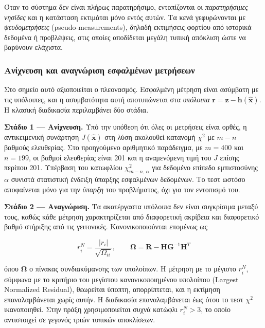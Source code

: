 Όταν το σύστημα δεν είναι πλήρως παρατηρήσιμο, εντοπίζονται οι \emph{παρατηρήσιμες νησίδες}
και η κατάσταση εκτιμάται μόνο εντός αυτών. Τα κενά γεφυρώνονται με \emph{ψευδομετρήσεις}
(pseudo-measurements), δηλαδή εκτιμήσεις φορτίου από ιστορικά δεδομένα ή προβλέψεις, στις
οποίες αποδίδεται μεγάλη τυπική απόκλιση ώστε να βαρύνουν ελάχιστα.

\subsubsection*{Ανίχνευση και αναγνώριση εσφαλμένων μετρήσεων}

Στο σημείο αυτό αξιοποιείται ο πλεονασμός. Εσφαλμένη μέτρηση είναι ασύμβατη με τις
υπόλοιπες, και η ασυμβατότητα αυτή αποτυπώνεται στα \emph{υπόλοιπα}
$\mathbf{r} = \mathbf{z}-\mathbf{h}(\hat{\mathbf{x}})$. Η κλασική διαδικασία περιλαμβάνει
δύο στάδια.

\textbf{Στάδιο 1 --- Ανίχνευση.} Υπό την υπόθεση ότι όλες οι μετρήσεις είναι ορθές, η
αντικειμενική συνάρτηση $J(\hat{\mathbf{x}})$ στη λύση ακολουθεί κατανομή $\chi^2$ με
$m-n$ βαθμούς ελευθερίας. Στο προηγούμενο αριθμητικό παράδειγμα, με $m = 400$ και
$n = 199$, οι βαθμοί ελευθερίας είναι 201 και η αναμενόμενη τιμή του $J$ επίσης περίπου
201. Υπέρβαση του κατωφλίου $\chi^2_{m-n,\,\alpha}$ για δεδομένο επίπεδο εμπιστοσύνης
$\alpha$ συνιστά στατιστική ένδειξη ύπαρξης εσφαλμένων δεδομένων. Το τεστ ωστόσο
αποφαίνεται μόνο για την \emph{ύπαρξη} του προβλήματος, όχι για τον εντοπισμό του.

\textbf{Στάδιο 2 --- Αναγνώριση.} Τα ακατέργαστα υπόλοιπα δεν είναι συγκρίσιμα μεταξύ τους,
καθώς κάθε μέτρηση χαρακτηρίζεται από διαφορετική ακρίβεια και διαφορετικό βαθμό στήριξης
από τις γειτονικές. Κανονικοποιούνται επομένως ως

\begin{equation}
r_i^{N} = \frac{|r_i|}{\sqrt{\Omega_{ii}}}, \qquad
\boldsymbol{\Omega} = \mathbf{R} - \mathbf{H}\mathbf{G}^{-1}\mathbf{H}^{T}
\label{eq:normres}
\end{equation}

όπου $\boldsymbol{\Omega}$ ο πίνακας συνδιακύμανσης των υπολοίπων. Η μέτρηση με το μέγιστο
$r_i^{N}$, σύμφωνα με το κριτήριο του μεγίστου κανονικοποιημένου υπολοίπου (Largest
Normalized Residual), θεωρείται ύποπτη, απορρίπτεται, και η εκτίμηση επαναλαμβάνεται χωρίς
αυτήν. Η διαδικασία επαναλαμβάνεται έως ότου το τεστ $\chi^2$ ικανοποιηθεί. Στην πράξη
χρησιμοποιείται συχνά κατώφλι $r_i^{N} > 3$, το οποίο αντιστοιχεί σε γεγονός τριών τυπικών
αποκλίσεων.


